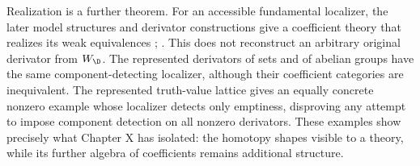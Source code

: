 Realization is a further theorem. For an accessible fundamental localizer, the later model structures and derivator constructions give a coefficient theory that realizes its weak equivalences \citep[Theorems~4.2.15 and 5.2.15]{Cisinski2006}; \citep[Theorem~6.11 and its dual]{Cisinski2003}. This does not reconstruct an arbitrary original derivator from $W_{\D}$. The represented derivators of sets and of abelian groups have the same component-detecting localizer, although their coefficient categories are inequivalent. The represented truth-value lattice gives an equally concrete nonzero example whose localizer detects only emptiness, disproving any attempt to impose component detection on all nonzero derivators. These examples show precisely what Chapter X has isolated: the homotopy shapes visible to a theory, while its further algebra of coefficients remains additional structure.

\nocite{*}

